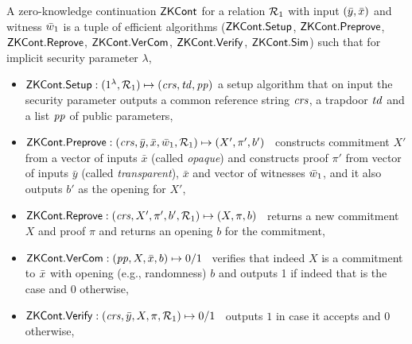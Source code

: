 \begin{definition}[ZK Continuations]
\label{def:zk_cont}
 A zero-knowledge continuation ${\mathsf{ZKCont}}$ for a relation $\mathcal{R}_1$ with 
input $(\bar{y}, \bar{x})$ and witness $\bar{w}_1$ is a tuple of efficient algorithms 
(${\mathsf{ZKCont}}.{\mathsf{Setup}}$, ${\mathsf{ZKCont}}.{\mathsf{Preprove}}$, ${\mathsf{ZKCont}}.{\mathsf{Reprove}}$, ${\mathsf{ZKCont}}.{\mathsf{VerCom}}$, ${\mathsf{ZKCont}}.{\mathsf{Verify}}$, ${\mathsf{ZKCont}}.{\mathsf{Sim}}$) 
such that for implicit security parameter $\lambda$,
\begin{itemize}

\item ${\mathsf{ZKCont}}.{\mathsf{Setup}}: (1^{\lambda}, \mathcal{R}_1) \mapsto (\mathit{crs}, \mathit{td}, \mathit{pp})$ a setup algorithm that on input the security parameter 
outputs a common reference string $\mathit{crs}$, a trapdoor $\mathit{td}$ and a list $\mathit{pp}$ of public parameters, 


\item ${\mathsf{ZKCont}}.{\mathsf{Preprove}}: (\mathit{crs}, \bar{y}, \bar{x}, \bar{w}_1, \mathcal{R}_1) \mapsto (X', \pi', b')$ \,
constructs commitment $X'$ from a vector of inputs $\bar{x}$ (called \emph{opaque}) and 
constructs proof $\pi'$ from vector of inputs 
$\bar{y}$ (called \emph{transparent}), $\bar{x}$ and vector of witnesses $\bar{w}_1$, and it 
also outputs $b'$ as the opening for $X'$,

\item ${\mathsf{ZKCont}}.{\mathsf{Reprove}}: (\mathit{crs}, X', \pi', b', \mathcal{R}_1) \mapsto (X, \pi, b)$ \,
returns a new commitment $X$ and proof $\pi$ and returns an opening $b$ for the commitment, 

\item ${\mathsf{ZKCont}}.{\mathsf{VerCom}}: (\mathit{pp}, X, \bar{x}, b) \mapsto 0/1$ \, 
verifies that indeed $X$ is a commitment to $\bar{x}$ with opening (e.g., randomness) $b$ and 
outputs 1 if indeed that is the case and 0 otherwise,
 
\item ${\mathsf{ZKCont}}.{\mathsf{Verify}}: (\mathit{crs}, \bar{y}, X, \pi, \mathcal{R}_1) \mapsto 0/1$ \, outputs $1$ in case it accepts  and $0$ otherwise,


\end{itemize}
\end{definition}
